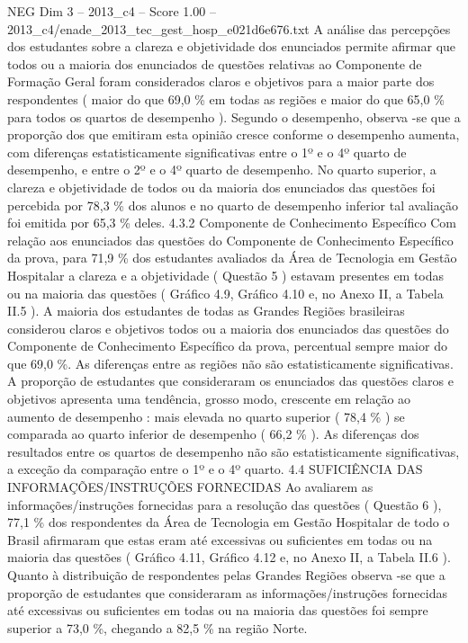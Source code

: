 \begin{textsample}{NEG Dim 3 – 2013\_c4 – Score 1.00 – 2013\_c4/enade\_2013\_tec\_gest\_hosp\_e021d6e676.txt}
A análise das percepções dos estudantes sobre a clareza e objetividade dos enunciados permite afirmar que todos ou a maioria dos enunciados de questões relativas ao Componente de Formação Geral foram considerados claros e objetivos para a maior parte dos respondentes ( maior do que 69,0 \% em todas as regiões e maior do que 65,0 \% para todos os quartos de desempenho ).
Segundo o desempenho, observa -se que a proporção dos que emitiram esta opinião cresce conforme o desempenho aumenta, com diferenças estatisticamente significativas entre o 1º e o 4º quarto de desempenho, e entre o 2º e o 4º quarto de desempenho.
No quarto superior, a clareza e objetividade de todos ou da maioria dos enunciados das questões foi percebida por 78,3 \% dos alunos e no quarto de desempenho inferior tal avaliação foi emitida por 65,3 \% deles. 4.3.2 Componente de Conhecimento Específico Com relação aos enunciados das questões do Componente de Conhecimento Específico da prova, para 71,9 \% dos estudantes avaliados da Área de Tecnologia em Gestão Hospitalar a clareza e a objetividade ( Questão 5 ) estavam presentes em todas ou na maioria das questões ( Gráfico 4.9, Gráfico 4.10 e, no Anexo II, a Tabela II.5 ).
A maioria dos estudantes de todas as Grandes Regiões brasileiras considerou claros e objetivos todos ou a maioria dos enunciados das questões do Componente de Conhecimento Específico da prova, percentual sempre maior do que 69,0 \%.
As diferenças entre as regiões não são estatisticamente significativas.
A proporção de estudantes que consideraram os enunciados das questões claros e objetivos apresenta uma tendência, grosso modo, crescente em relação ao aumento de desempenho : mais elevada no quarto superior ( 78,4 \% ) se comparada ao quarto inferior de desempenho ( 66,2 \% ).
As diferenças dos resultados entre os quartos de desempenho não são estatisticamente significativas, a exceção da comparação entre o 1º e o 4º quarto. 4.4 SUFICIÊNCIA DAS INFORMAÇÕES/INSTRUÇÕES FORNECIDAS Ao avaliarem as informações/instruções fornecidas para a resolução das questões ( Questão 6 ), 77,1 \% dos respondentes da Área de Tecnologia em Gestão Hospitalar de todo o Brasil afirmaram que estas eram até excessivas ou suficientes em todas ou na maioria das questões ( Gráfico 4.11, Gráfico 4.12 e, no Anexo II, a Tabela II.6 ).
Quanto à distribuição de respondentes pelas Grandes Regiões observa -se que a proporção de estudantes que consideraram as informações/instruções fornecidas até excessivas ou suficientes em todas ou na maioria das questões foi sempre superior a 73,0 \%, chegando a 82,5 \% na região Norte.

\end{textsample}
